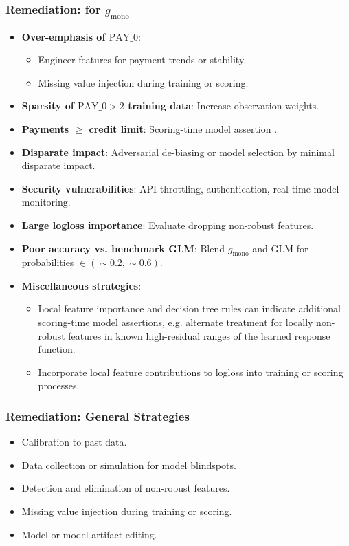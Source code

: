 \documentclass[11pt,
               aspectratio=169,
               hyperref={colorlinks}
               ]{beamer}
\begin{document}
			\begin{frame}
		
				\frametitle{\textbf{Remediation}: for $g_{\text{mono}}$}
				
				\begin{itemize}\scriptsize
					\item \textbf{Over-emphasis of $\text{PAY\_0}$}:
					\begin{itemize}\scriptsize
						\item Engineer features for payment trends or stability.
						\item Missing value injection during training or scoring.
					\end{itemize}
					\item \textbf{Sparsity of $\text{PAY\_0} > 2$ training data}: Increase observation weights. 
					\item \textbf{Payments $\geq$ credit limit}: Scoring-time model assertion \cite{kangdebugging}. 
					\item \textbf{Disparate impact}: Adversarial de-biasing \cite{zhang2018mitigating} or model selection by minimal disparate impact. 
					\item \textbf{Security vulnerabilities}: API throttling, authentication, real-time model monitoring. 
					\item \textbf{Large logloss importance}: Evaluate dropping non-robust features.
					\item \textbf{Poor accuracy vs. benchmark GLM}: Blend $g_{\text{mono}}$ and GLM for probabilities $\in (\sim0.2, \sim0.6)$.
					\item \textbf{Miscellaneous strategies}: 
					\begin{itemize}\scriptsize
						\item Local feature importance and decision tree rules can indicate additional scoring-time model assertions, e.g. alternate treatment for locally non-robust features in known high-residual ranges of the learned response function. 
						\item Incorporate local feature contributions to logloss into training or scoring processes.
					\end{itemize}
				\end{itemize}
				\normalsize

			\end{frame}		
			
			\begin{frame}
		
				\frametitle{\textbf{Remediation}: General Strategies}

				\begin{itemize}
					\item Calibration to past data.
					\item Data collection or simulation for model blindspots.
					\item Detection and elimination of non-robust features.
					\item Missing value injection during training or scoring.
					\item Model or model artifact editing.
				\end{itemize}				
				
			\end{frame}
\end{document}
